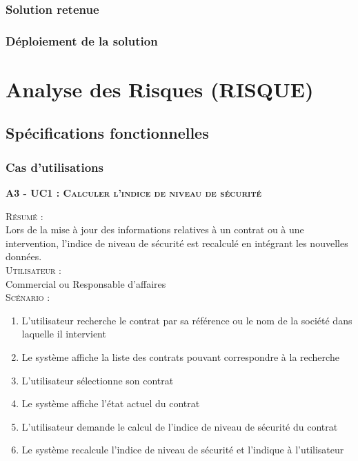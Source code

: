 \subsubsection{Solution retenue}


\subsubsection{Déploiement de la solution}


\section{Analyse des Risques (RISQUE)}%

\subsection{Spécifications fonctionnelles}

\subsubsection{Cas d’utilisations}

\noindent\textsc{\bf{A3 - UC1 :} Calculer l’indice de niveau de sécurité}
\begin{shaded}
\noindent\textsc{Résumé :}\\

Lors de la mise à jour des informations relatives à un contrat ou à une intervention, l’indice de niveau de sécurité est recalculé en intégrant les nouvelles données. \\

\noindent\textsc{Utilisateur :} \\

Commercial ou Responsable d’affaires \\

\noindent\textsc{Scénario :} \\
\begin{enumerate}
    \item L’utilisateur recherche le contrat par sa référence ou le nom de la société dans laquelle il intervient
    \item Le système affiche la liste des contrats pouvant correspondre à la recherche
    \item L’utilisateur sélectionne son contrat
    \item Le système affiche l’état actuel du contrat
    \item L’utilisateur demande le calcul de l’indice de niveau de sécurité du contrat
    \item Le système recalcule l’indice de niveau de sécurité et l’indique à l’utilisateur
\end{enumerate}
\end{shaded}


